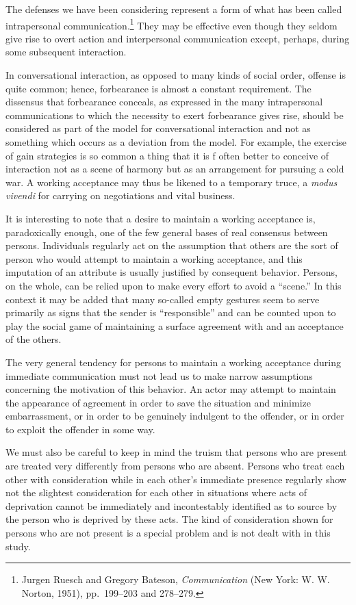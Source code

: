 \documentclass[twoside,symmetric,nobib,justified]{tufte-book}
\begin{document}
The defenses we have been considering represent a form of what has been
called intrapersonal communication.\footnote{Jurgen Ruesch and Gregory
  Bateson, \emph{Communication} (New York: W. W. Norton, 1951),
  pp.~199--203 and 278--279.} They may be effective even though they
seldom give rise to overt action and interpersonal communication except,
perhaps, during some subsequent interaction.

In conversational interaction, as opposed to many kinds of social order,
offense is quite common; hence, forbearance is almost a constant
requirement. The dissensus that forbearance conceals, as expressed in
the many intrapersonal communications to which the necessity to exert
forbearance gives rise, should be considered as part of the model for
conversational interaction and not as something which occurs as a
deviation from the model. For example, the exercise of gain strategies
is so common a thing that it is f often better to conceive of
interaction not as a scene of harmony but as an arrangement for pursuing
a cold war. A working acceptance may thus be likened to a temporary
truce, a \emph{modus vivendi} for carrying on negotiations and vital
business.

It is interesting to note that a desire to maintain a working acceptance
is, paradoxically enough, one of the few general bases of real consensus
between persons. Individuals regularly act on the assumption that others
are the sort of person who would attempt to maintain a working
acceptance, and this imputation of an attribute is usually justified by
consequent behavior. Persons, on the whole, can be relied upon to make
every effort to avoid a ``scene.'' In this context it may be added that
many so-called empty gestures seem to serve primarily as signs that the
sender is ``responsible'' and can be counted upon to play the social
game of maintaining a surface agreement with and an acceptance of the
others.

The very general tendency for persons to maintain a working acceptance
during immediate communication must not lead us to make narrow
assumptions concerning the motivation of this behavior. An actor may
attempt to maintain the appearance of agreement in order to save the
situation and minimize embarrassment, or in order to be genuinely
indulgent to the offender, or in order to exploit the offender in some
way.

We must also be careful to keep in mind the truism that persons who are
present are treated very differently from persons who are absent.
Persons who treat each other with consideration while in each other's
immediate presence regularly show not the slightest consideration for
each other in situations where acts of deprivation cannot be immediately
and incontestably identified as to source by the person who is deprived
by these acts. The kind of consideration shown for persons who are not
present is a special problem and is not dealt with in this study.
\end{document}
